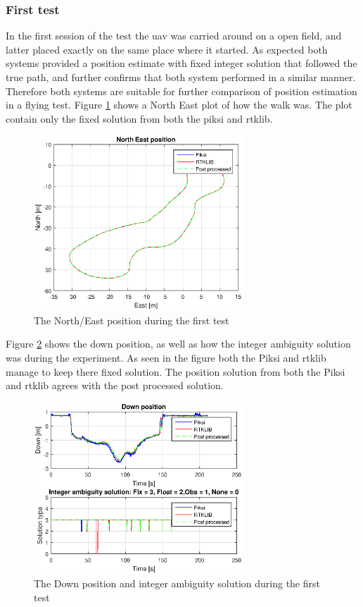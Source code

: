 \subsubsection{First test}
In the first session of the test the \gls{uav} was carried around on a open field, and latter placed exactly on the same place where it started. As expected both systems provided a position estimate with fixed integer solution that followed the true path, and further confirms that both system performed in a similar manner. Therefore both systems are suitable for further comparison of position estimation in a flying test.
Figure \ref{figure:xywalk1} shows a North East plot of how the walk was. The plot contain only the fixed solution from both the piksi and rtklib. 
\begin{figure}[H]
	\centering
		\includegraphics[width=0.7\textwidth]{figs/plots/xywalk1.eps}
		\caption{The North/East position during the first test}
		\label{figure:xywalk1}
\end{figure}
Figure \ref{figure:DownAndAmbwalk1} shows the down position, as well as how the integer ambiguity solution was during the experiment. As seen in the figure both the Piksi and \gls{rtklib} manage to keep there fixed solution. The position solution from both the Piksi and \gls{rtklib} agrees with the post processed solution. 
\begin{figure}[H]
	\centering
		\includegraphics[width=0.7\textwidth]{figs/plots/downWalk1.eps}
		\caption{The Down position and integer ambiguity solution during the first test}
		\label{figure:DownAndAmbwalk1}
\end{figure}

